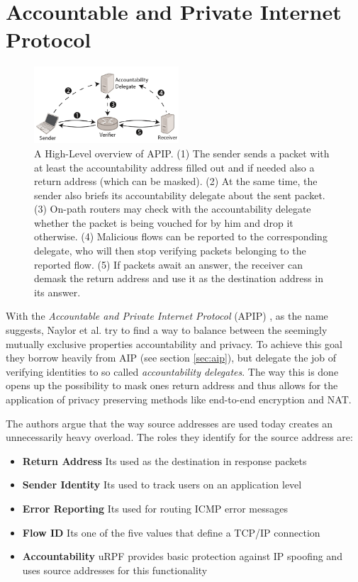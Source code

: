 \documentclass{acm_proc_article-sp}
\begin{document}


\section{Accountable and Private Internet Protocol}
\label{sec:apip}
\begin{figure}[t]
  \includegraphics[width=0.48\textwidth]{images/apipoverview.PNG}
  \caption{A High-Level overview of APIP. (1) The sender sends a packet with at least the accountability address filled out and if needed also a return address (which can be masked). (2) At the same time, the sender also briefs its accountability delegate about the sent packet. (3) On-path routers may check with the accountability delegate whether the packet is being vouched for by him and drop it otherwise. (4) Malicious flows can be reported to the corresponding delegate, who will then stop verifying packets belonging to the reported flow. (5) If packets await an answer, the receiver can demask the return address and use it as the destination address in its answer. \cite{apip}}
  \label{fig:apipoverview}
\end{figure}
With the \emph{Accountable and Private Internet Protocol} (APIP) \cite{apip}, as the name suggests, Naylor et al. try to find a way to balance between the seemingly mutually exclusive properties accountability and privacy. To achieve this goal they borrow heavily from AIP (see section \ref{sec:aip}), but delegate the job of verifying identities to so called \emph{accountability delegates}. The way this is done opens up the possibility to mask ones return address and thus allows for the application of privacy preserving methods like end-to-end encryption and NAT.

The authors argue that the way source addresses are used today creates an unnecessarily heavy overload. The roles they identify for the source address are:

\begin{itemize}
\item \textbf{Return Address} Its used as the destination in response packets
\item \textbf{Sender Identity} Its used to track users on an application level
\item \textbf{Error Reporting} Its used for routing ICMP error messages
\item \textbf{Flow ID} Its one of the five values that define a TCP/IP connection 
\item \textbf{Accountability} uRPF provides basic protection against IP spoofing and uses source addresses for this functionality
\end{itemize}
\end{document}
